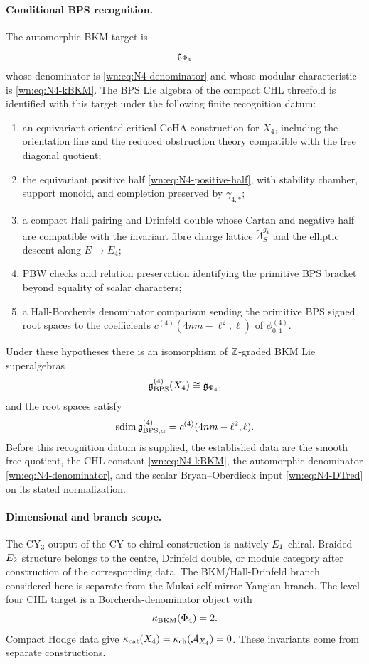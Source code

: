 \paragraph{Conditional BPS recognition.}
The automorphic BKM target is
\[
  \mathfrak{g}_{\Phi_4}
\]
whose denominator is \eqref{wn:eq:N4-denominator} and whose
modular characteristic is \eqref{wn:eq:N4-kBKM}.  The BPS Lie algebra
of the compact CHL threefold is identified with this target under the
following finite recognition datum:
\begin{enumerate}
  \item an equivariant oriented critical-CoHA construction for
  $X_4$, including the orientation line and the reduced obstruction
  theory compatible with the free diagonal quotient;
  \item the equivariant positive half \eqref{wn:eq:N4-positive-half}, with
  stability chamber, support monoid, and completion preserved by
  $\gamma_{4,*}$;
  \item a compact Hall pairing and Drinfeld double whose Cartan and
  negative half are compatible with the invariant fibre charge lattice
  $\widetilde\Lambda_S^{g_4}$ and the elliptic descent along
  $E\to E_4$;
  \item PBW checks and relation preservation identifying the primitive
  BPS bracket beyond equality of scalar characters;
  \item a Hall-Borcherds denominator comparison sending the primitive
  BPS signed root spaces to the coefficients
  $c^{(4)}(4nm-\ell^2,\ell)$ of $\phi^{(4)}_{0,1}$.
\end{enumerate}
Under these hypotheses there is an isomorphism of
$\mathbb{Z}$-graded BKM Lie superalgebras
\begin{equation}
  \mathfrak{g}_{\mathrm{BPS}}^{(4)}(X_4)\cong \mathfrak{g}_{\Phi_4},
  \label{wn:eq:N4-conditional-BPS-BKM}
\end{equation}
and the root spaces satisfy
\[
  \mathrm{sdim}\,\mathfrak{g}_{\mathrm{BPS},\alpha}^{(4)}
  =
  c^{(4)}(4nm-\ell^2,\ell).
\]
Before this recognition datum is supplied, the established data are the
smooth free quotient, the CHL constant \eqref{wn:eq:N4-kBKM}, the
automorphic denominator \eqref{wn:eq:N4-denominator}, and the scalar
Bryan--Oberdieck input \eqref{wn:eq:N4-DTred} on its stated
normalization.

\paragraph{Dimensional and branch scope.}
The CY$_3$ output of the CY-to-chiral construction is natively
$E_1$-chiral.  Braided $E_2$ structure belongs to the centre,
Drinfeld double, or module category after construction of the
corresponding data.  The BKM/Hall-Drinfeld branch considered here is
separate from the Mukai self-mirror Yangian branch.  The
level-four CHL target is a Borcherds-denominator object with
\[
  \kappa_{\mathrm{BKM}}(\Phi_4)=2.
\]
Compact Hodge data give $\kappa_{\mathrm{cat}}(X_4)=\kappa_{\mathrm{ch}}(\mathcal{A}_{X_4})=0$.
These invariants come from separate constructions.
